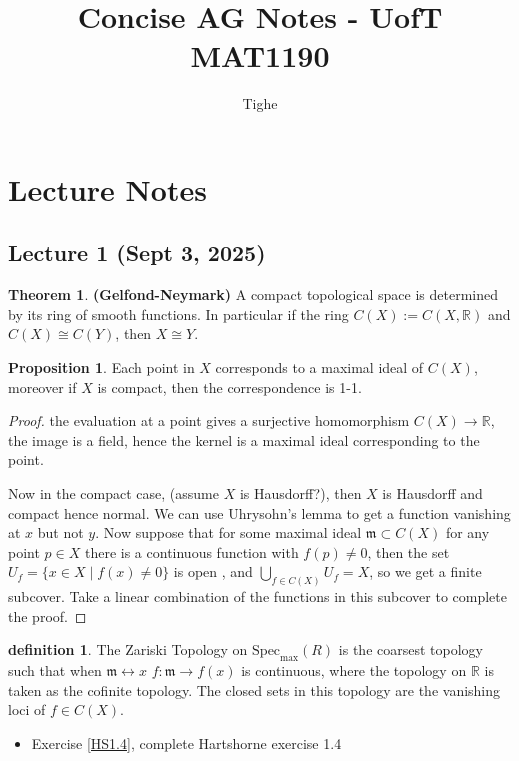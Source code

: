 \documentclass[10.5pt]{article}
\title{Concise AG Notes - UofT MAT1190}
\author{Tighe}
\theoremstyle{definition}
\newtheorem{theorem}{Theorem}
\newtheorem{proposition}{Proposition}
\newtheorem{definition}{definition}
\newcommand{\set}[1]{\{#1\}}
\newcommand{\spec}{\text{Spec}}
\begin{document}
\maketitle
    \section{Lecture Notes}
    \subsection{Lecture 1 (Sept 3, 2025)}
    \begin{theorem}\textbf{(Gelfond-Neymark)}
        A compact topological space is determined by its ring of smooth functions. In particular if the ring \(C(X) := C(X,\mathbb{R})\) and \(C(X) \cong C(Y)\), then \(X \cong Y\).
    \end{theorem}
    \begin{proposition} Each point in \(X\) corresponds to a maximal ideal of \(C(X)\), moreover if \(X\) is compact, then the correspondence is 1-1.
    \end{proposition}
    \begin{proof}
        the evaluation at a point gives a surjective homomorphism \(C(X) \to \mathbb{R}\), the image is a field, hence the kernel is a maximal ideal corresponding to the point.

        Now in the compact case, (assume \(X\) is Hausdorff?), then \(X\) is Hausdorff and compact hence normal. We can use Uhrysohn's lemma to get a function vanishing at \(x\) but not \(y\). Now suppose that for some maximal ideal \(\mathfrak{m} \subset C(X)\) for any point \(p \in X\) there is a continuous function with \(f(p) \neq 0\), then the set \(U_f = \set{x \in X \mid f(x) \neq 0}\) is open , and \(\bigcup_{f \in C(X)}U_f = X\), so we get a finite subcover. Take a linear combination of the functions in this subcover to complete the proof.
    \end{proof}
    \begin{definition}
        The Zariski Topology on \(\spec_{\max}(R)\) is the coarsest topology such that when \(\mathfrak{m} \leftrightarrow x\) \(f: \mathfrak{m} \to f(x)\) is continuous, where the topology on \(\mathbb{R}\) is taken as the cofinite topology. The closed sets in this topology are the vanishing loci of \(f \in C(X)\).
    \end{definition}
    \begin{itemize}
        \item Exercise \ref{HS1.4}, complete Hartshorne exercise 1.4
    \end{itemize}
\end{document}
